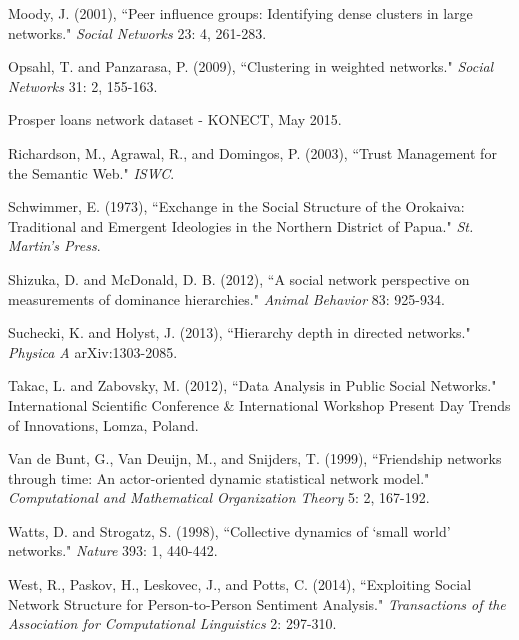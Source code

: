 \documentclass[3p,times]{elsarticle}
\begin{document}
\begin{thebibliography}{9}
	Moody, J. (2001),
	``Peer influence groups: Identifying dense clusters in large networks."
	\textit{Social Networks} 23: 4, 261-283.
	
	Opsahl, T. and Panzarasa, P. (2009),
	``Clustering in weighted networks."
	\textit{Social Networks} 31: 2, 155-163.
	
	Prosper loans network dataset - KONECT, May 2015.
	
	Richardson, M., Agrawal, R., and Domingos, P. (2003),
	``Trust Management for the Semantic Web." \textit{ISWC}.
	
	Schwimmer, E. (1973),
	``Exchange in the Social Structure of the Orokaiva: Traditional and Emergent Ideologies in the Northern District of Papua." \textit{St. Martin's Press}.
	
	Shizuka, D. and McDonald, D. B. (2012),
	``A social network perspective on measurements of dominance hierarchies." 
	\textit{Animal Behavior} 83: 925-934.
	
	Suchecki, K. and Holyst, J. (2013),
	``Hierarchy depth in directed networks." 
	\textit{Physica A} arXiv:1303-2085.
	
	Takac, L. and Zabovsky, M. (2012),
	``Data Analysis in Public Social Networks."
	International Scientific Conference \& International Workshop Present Day Trends of Innovations, Lomza, Poland.
	
	Van de Bunt, G., Van Deuijn, M., and Snijders, T. (1999),
	``Friendship networks through time: An actor-oriented dynamic statistical network model."
	\textit{Computational and Mathematical Organization Theory} 5: 2, 167-192.
	
	Watts, D. and Strogatz, S. (1998),
	``Collective dynamics of `small world' networks."
	\textit{Nature} 393: 1, 440-442.
	
	West, R., Paskov, H., Leskovec, J., and Potts, C. (2014),
	``Exploiting Social Network Structure for Person-to-Person Sentiment Analysis."
	\textit{Transactions of the Association for Computational Linguistics} 2: 297-310.

	


    
    
    
\end{thebibliography}


\end{document}
